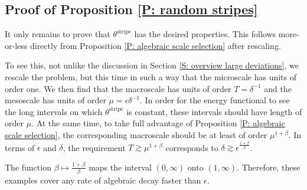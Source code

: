 \documentclass[12pt]{amsart}
\begin{document}
\subsection{Proof of Proposition \ref{P: random stripes}} It only remains to prove that $\theta^{\text{stripe}}$ has the desired properties.  This follows more-or-less directly from Proposition \ref{P: algebraic scale selection} after rescaling.

To see this, not unlike the discussion in Section \ref{S: overview large deviations}, we rescale the problem, but this time in such a way that the microscale has units of order one.  We then find that the macroscale has units of order $T = \delta^{-1}$ and the mesoscale has units of order $\mu = \epsilon \delta^{-1}$.  In order for the energy functional to see the long intervals on which $\theta^{\text{stripe}}$ is constant, these intervals should have length of order $\mu$.  At the same time, to take full advantage of Proposition \ref{P: algebraic scale selection}, the corresponding macroscale should be at least of order $\mu^{1 + \beta}$.  In terms of $\epsilon$ and $\delta$, the requirement $T \gtrsim \mu^{1 + \beta}$ corresponds to $\delta \gtrsim \epsilon^{\frac{1 + \beta}{\beta}}$.

The function $\beta \mapsto \frac{1 + \beta}{\beta}$ maps the interval $(0,\infty)$ onto $(1,\infty)$.  Therefore, these examples cover any rate of algebraic decay faster than $\epsilon$.
\end{document}
